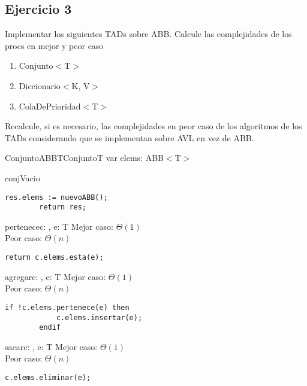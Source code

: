 \subsection{Ejercicio 3}
Implementar los siguientes TADs sobre ABB. Calcule las complejidades de los procs en mejor y peor caso
\begin{enumerate}
	\item Conjunto$<$T$>$
	\item Diccionario$<$K, V$>$
	\item ColaDePrioridad$<$T$>$
\end{enumerate}

Recalcule, si es necesario, las complejidades en peor caso de los algoritmos de los TADs considerando que se implementan sobre AVL en vez de ABB.

\begin{module}{ConjuntoABB}{T}{Conjunto}{T}
	var elems: ABB$<$T$>$

	\begin{proc}{conjVacio}{}{\moduletype}
		\begin{lstlisting}[numbers=none,frame=none]
		res.elems := nuevoABB();
		return res;
		\end{lstlisting}
	\end{proc}

	\begin{proc}{pertenece}{\In c: \moduletype, \In e: T}{\bool}
		Mejor caso: $\Theta(1)$\\
		Peor caso: $\Theta(n)$
		\begin{lstlisting}[numbers=none,frame=none]
		return c.elems.esta(e);
		\end{lstlisting}
	\end{proc}

	\begin{proc}{agregar}{\Inout c: \moduletype, \In e: T}{}
		Mejor caso: $\Theta(1)$\\
		Peor caso: $\Theta(n)$
		\begin{lstlisting}[numbers=none,frame=none]
		if !c.elems.pertenece(e) then
			c.elems.insertar(e);
		endif
		\end{lstlisting}
	\end{proc}

	\begin{proc}{sacar}{\Inout c: \moduletype, \In e: T}{}
		Mejor caso: $\Theta(1)$\\
		Peor caso: $\Theta(n)$
		\begin{lstlisting}[numbers=none,frame=none]
		c.elems.eliminar(e);
		\end{lstlisting}
	\end{proc}


\end{module}
